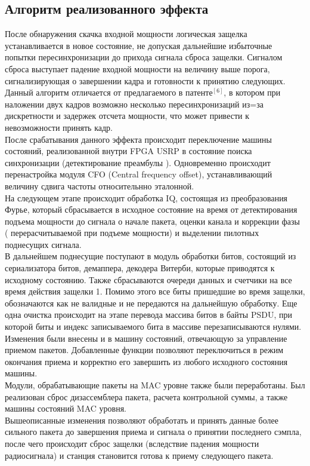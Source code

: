 \documentclass{llncs}
\begin{document}
\subsection{Алгоритм реализованного эффекта}
После обнаружения скачка входной мощности логическая защелка устанавливается в новое состояние, не допуская дальнейшие избыточные попытки пересинхронизации до прихода сигнала сброса защелки. Сигналом сброса выступает падение входной мощности на величину выше порога, сигнализирующая о завершении кадра и готовности к принятию следующих. Данный алгоритм отличается от предлагаемого в патенте$^{[6]}$, в котором при наложении двух кадров возможно несколько пересинхронизаций из=за дискретности и задержек отсчета мощности, что может привести к невозможности принять кадр.
\\
После срабатывания данного эффекта происходит переключение машины состояний, реализованной внутри FPGA USRP в состояние поиска синхронизации (детектирование преамбулы ). Одновременно происходит перенастройка модуля CFO (Central frequency offset), устанавливающий величину сдвига частоты относительнно эталонной. 
\\
На следующем этапе происходит обработка IQ, состоящая из преобразования Фурье, который сбрасывается в исходное состояние на время от детектирования подъема мощности до сигнала о начале пакета, оценки канала и коррекции фазы ( перерасчитываемой при подъеме мощности) и выделении пилотных поднесущих сигнала.
\\
В дальнейшем поднесущие поступают в модуль обработки битов, состоящий из  сериализатора битов, демаппера, декодера Витерби, которые приводятся к исходному состоянию. Также сбрасываются  очереди данных и счетчики на все время действия защелки 1. Помимо этого все биты пришедшие во время защелки, обозначаются как не валидные и не передаются на дальнейшую обработку. Еще одна очистка происходит на этапе перевода массива битов в байты PSDU, при которой биты и индекс записываемого  бита в массиве  перезаписываются нулями.
\\
Изменения были внесены и в машину состояний, отвечающую за управление приемом пакетов. Добавленные функции позволяют переключиться в режим окончания приема и корректно его завершить из любого исходного состояния машины. 
\\
Модули, обрабатывающие пакеты на MAC уровне также были переработаны. Был реализован сброс дизассемблера пакета, расчета контрольной суммы, а также машины состояний MAC уровня.
\\
Вышеописанные изменения позволяют  обработать и принять данные более сильного пакета до завершения приема и сигнала о принятии последнего сэмпла, после чего происходит сброс защелки (вследствие падения мощности радиосигнала) и станция становится готова к приему следующего пакета.
\end{document}
